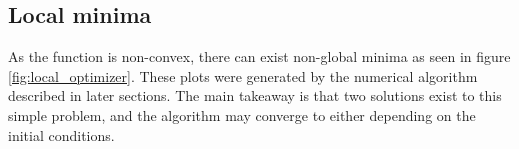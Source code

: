 \subsection{Local minima}

As the function is non-convex, there can exist non-global minima as seen in figure \ref{fig:local_optimizer}. These plots were generated by the numerical algorithm described in later sections. The main takeaway is that two solutions exist to this simple problem, and the algorithm may converge to either depending on the initial conditions. 

